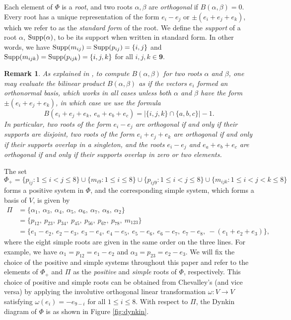 \documentclass[10pt,a4paper]{amsart}
\newtheorem{rmk}[theorem]{Remark}
\numberwithin{equation}{section}
\newcommand{\al}{\alpha}
\newcommand{\be}{\beta}
\newcommand{\ra}{\rightarrow}
\newcommand{\simproots}{\Pi}
\newcommand{\posroots}{{\Phi_+}}
\newcommand{\mr}{m}
\newcommand{\pr}{p}
\newcommand{\nine}{\mathbf{9}}
\DeclareMathOperator{\supp}{\rm{Supp}}
\begin{document}
Each element of $\Phi$ is a \emph{root}, and two roots $\al,\be$ are
\emph{orthogonal} if $B(\al,\be)=0$. Every root has a unique representation of
the form $e_i - e_j$ or $\pm(e_i + e_j + e_k)$, which we refer to as the {\it
standard form} of the root. We define the {\it support} of a root $\al$,
$\supp(\al)$, to be its support when written in standard form. In other words,
we have $\supp(\mr_{ij})=\supp(\pr_{ij})=\{i,j\}$ and
$\supp(\mr_{ijk})=\supp(\pr_{ijk})=\{i,j,k\}$ for all $i,j,k\in \nine$.

\begin{rmk}
\label{rmk:orthog}
As explained in \cite[Section 4.2]{vinberg88}, to compute $B(\al,\be)$ for two
roots $\al$ and $\be$, one may evaluate the bilinear product $B(\al, \be)$ as if
the vectors $e_i$ formed an orthonormal basis, which works in all cases unless both
$\al$ and $\be$ have the form $\pm(e_i + e_j + e_k)$, in which case we use the
formula 
\begin{equation}
\label{eq:overlap}
B(e_i + e_j + e_k, \ e_a + e_b + e_c) = |\{i, j, k\} \cap \{a, b, c\}| - 1 .
\end{equation}
In particular, two roots of the form $e_i - e_j$ are orthogonal if and only if
their supports are disjoint, two roots of the form $e_i + e_j + e_k$ are
orthogonal if and only if their supports overlap in a singleton, and the roots
$e_i - e_j$ and $e_a + e_b + e_c$ are orthogonal if and only if their supports
overlap in zero or two elements. \end{rmk}

The set 
\begin{equation}
\label{eq:pos}
\posroots = \{\pr_{ij} : 1 \leq i < j \leq 8\} \cup \{\mr_{i9} : 1
\leq i \leq 8\} \cup \{\pr_{ij9} : 1 \leq i < j \leq 8\} \cup \{\mr_{ijk} : 1
\leq i < j < k \leq 8\}
\end{equation}
forms a positive system in $\Phi$, and the
corresponding simple system, which forms a basis of $V$, is given by 
\begin{align*} 
  \simproots &= \{\al_1, \
  \al_3, \ \al_4, \ \al_5, \ \al_6, \ \al_7, \ \al_8, \ \al_2\}\\ &= \{\pr_{12},
  \ \pr_{23}, \ \pr_{34}, \ \pr_{45}, \ \pr_{56}, \ \pr_{67}, \ \pr_{78}, \
  \mr_{123} \} \\ &= \{e_1 - e_2, \ e_2 - e_3, \ e_3 - e_4, \ e_4 - e_5, \ e_5 -
e_6, \ e_6 - e_7, \ e_7 - e_8, \ -(e_1 + e_2 + e_3) \},
\end{align*} 
where the eight simple roots are given in the same order on the three lines. For
example, we have $\al_1=p_{12}=e_1-e_2$ and $\al_3=p_{23}=e_2-e_3$. We will fix
the choice of the positive and simple systems throughout this paper and refer to
the elements of $\posroots$ and $\simproots$ as the \emph{positive} and
\emph{simple} roots of $\Phi$, respectively. This choice of positive and simple
roots can be obtained from Chevalley's (and vice versa) by applying the
involutive orthogonal linear transformation $\omega : V \ra V$ satisfying
$\omega(e_i) = -e_{9-i}$ for all $1 \leq i \leq 8$. With respect to $\Pi$, the
Dynkin diagram of $\Phi$ is as shown in Figure \ref{fig:dynkin}. 
\end{document}
